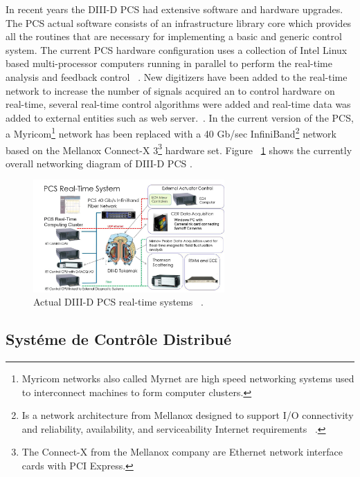 In recent years the DIII-D PCS had extensive software and hardware upgrades. The PCS actual software consists of an infrastructure library core which provides all the routines that are necessary for implementing a basic and generic control system. The current  PCS hardware configuration uses a collection of  Intel Linux based multi-processor computers running in parallel to perform the real-time analysis and feedback control ~\cite{DIIID2013}. New digitizers have been added to the real-time network to increase the number of signals acquired an to control hardware on real-time, several real-time control algorithms were added and real-time data was added to external entities such as web server.~\cite{DIIIDnew}. In the current version of the PCS, a Myricom\footnote{Myricom networks also called Myrnet are high speed networking systems used to interconnect machines to form computer clusters. } network has been replaced with a 40 Gb/sec InfiniBand\footnote{Is a network architecture from Mellanox designed to support I/O connectivity  and  reliability, availability, and serviceability Internet requirements ~\cite{MellanoxTechnologies2003}.  } network based on the Mellanox Connect-X 3\footnote{The Connect-X from the Mellanox company are Ethernet network interface cards with PCI Express.} hardware set. Figure ~\ref{DIIInew} shows the currently overall networking diagram of DIII-D PCS .


\begin{figure}[htbp]
	\centering
	\includegraphics[width=0.65\textwidth]{Chp2/DIIIDPCSnew.PNG}
	\caption{\label{DIIInew} Actual DIII-D PCS real-time systems ~\cite{DIIIDnew}.  }
\end{figure}


\subsection{Syst\'eme de Contr\^ole Distribu\'e}

